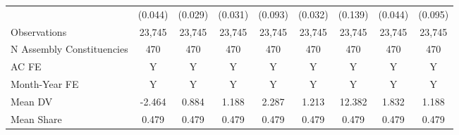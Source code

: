 {\begin{tabular}{l*{8}{c}}
            &     (0.044)         &     (0.029)         &     (0.031)         &     (0.093)         &     (0.032)         &     (0.139)         &     (0.044)         &     (0.095)         \\
Observations&      23,745         &      23,745         &      23,745         &      23,745         &      23,745         &      23,745         &      23,745         &      23,745         \\
N Assembly Constituencies&         470         &         470         &         470         &         470         &         470         &         470         &         470         &         470         \\
AC FE       &           Y         &           Y         &           Y         &           Y         &           Y         &           Y         &           Y         &           Y         \\
Month-Year FE&           Y         &           Y         &           Y         &           Y         &           Y         &           Y         &           Y         &           Y         \\
Mean DV     &      -2.464         &       0.884         &       1.188         &       2.287         &       1.213         &      12.382         &       1.832         &       1.188         \\
Mean Share  &       0.479         &       0.479         &       0.479         &       0.479         &       0.479         &       0.479         &       0.479         &       0.479         \\
\bottomrule
\end{tabular}
}
